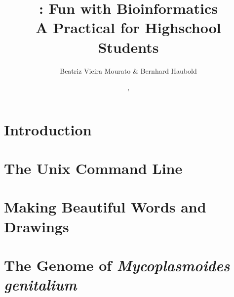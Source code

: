 \documentclass[a4paper]{report}
\begin{document}
\pagestyle{noweb}

\title{:  Fun with Bioinformatics\\\small A Practical for
  Highschool Students\\\scriptsize {}}
\author{Beatriz Vieira Mourato \& Bernhard Haubold}
\date{\hspace{-3pt}, }
\maketitle

\tableofcontents

\chapter{Introduction}\label{ch:intro}

\chapter{The Unix Command Line}\label{ch:unix}

\chapter{Making Beautiful Words and Drawings}\label{ch:latex}

\chapter{The Genome of \emph{Mycoplasmoides genitalium}}\label{ch:genome}



\end{document}
